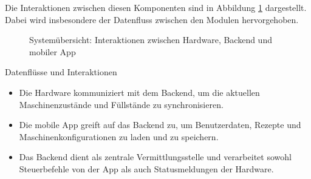 Die Interaktionen zwischen diesen Komponenten sind in Abbildung \ref{fig:system_overview} dargestellt. Dabei wird insbesondere der Datenfluss zwischen den Modulen hervorgehoben.

\begin{figure}[htbp]
  \centering

	\caption{Systemübersicht: Interaktionen zwischen Hardware, Backend und mobiler App}
	\label{fig:system_overview}
\end{figure}

Datenflüsse und Interaktionen

\begin{itemize}
  \item Die Hardware kommuniziert mit dem Backend, um die aktuellen Maschinenzustände und Füllstände zu synchronisieren.
  \item Die mobile App greift auf das Backend zu, um Benutzerdaten, Rezepte und Maschinenkonfigurationen zu laden und zu speichern.
  \item Das Backend dient als zentrale Vermittlungsstelle und verarbeitet sowohl Steuerbefehle von der App als auch Statusmeldungen der Hardware.
\end{itemize}

